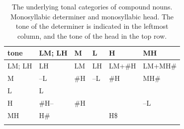 \begin{subtables}
\label{tab:abstractcompounds}

\begin{table}[p]%
\caption{\label{tab:abstractmonosyllabicmonosyllables}The underlying tonal categories of compound
  nouns. Monosyllabic determiner and monosyllabic head. The tone of the determiner is indicated in the leftmost column, and the tone of the head in the top row.}
{\renewcommand{\arraystretch}{1.35}
\begin{tabularx}{\textwidth}{ Q  Q  Q  Q  Q  Q }
\lsptoprule
	tone & LM; LH & M & L & H & MH\\ \midrule
	LM; LH & LH & LM & LH & LM+\#H & LM+MH\#\\
	M & --L & \#H & --L & \#H & MH\#\\
	L & L &  &  &  & \hspace*{\fill}\\
	H & \#H-- & \#H &  &
   \hspace*{\fill} & --L\\
	MH & H\# &  &  \hspace*{\fill} & H\$ & \hspace*{\fill}\\
\lspbottomrule
\end{tabularx}}
\end{table}


\end{subtables}
